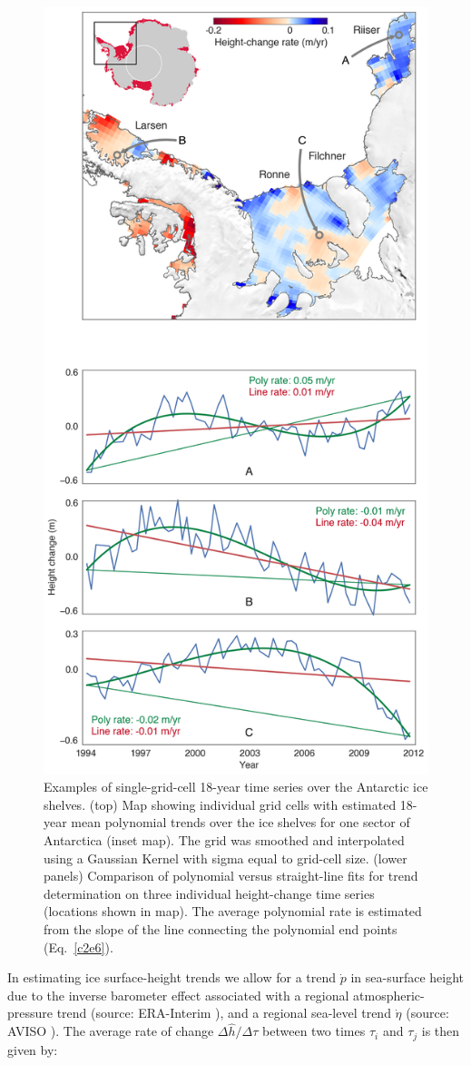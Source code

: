\begin{figure}[!ht]
  \centering
  \includegraphics[width=.566\textwidth]{img/map_single_series_v9b.png}
  \caption[Examples of single-grid-cell 18-year time series]{
  Examples of single-grid-cell 18-year time series over the Antarctic ice shelves. (top) Map showing individual grid cells with estimated 18-year mean polynomial trends over the ice shelves for one sector of Antarctica (inset map). The grid was smoothed and interpolated using a Gaussian Kernel with sigma equal to grid-cell size.  (lower panels) Comparison of polynomial versus straight-line fits for trend determination on three individual height-change time series (locations shown in map). The average polynomial rate is estimated from the slope of the line connecting the polynomial end points (Eq.~\ref{c2e6}).}
  \label{c2f6}
\end{figure}


In estimating ice surface-height trends we allow for a trend $\dot p$ in sea-surface height due to the inverse barometer effect associated with a regional atmospheric-pressure trend \parencite{Padman2003} (source: ERA-Interim \parencite{Dee2011}), and a regional sea-level trend $\dot \eta$ (source: AVISO \parencite{LeTraon1998}). The average rate of change $\Delta \hat h/\Delta \tau$ between two times $\tau_i$ and $\tau_j$ is then given by:

